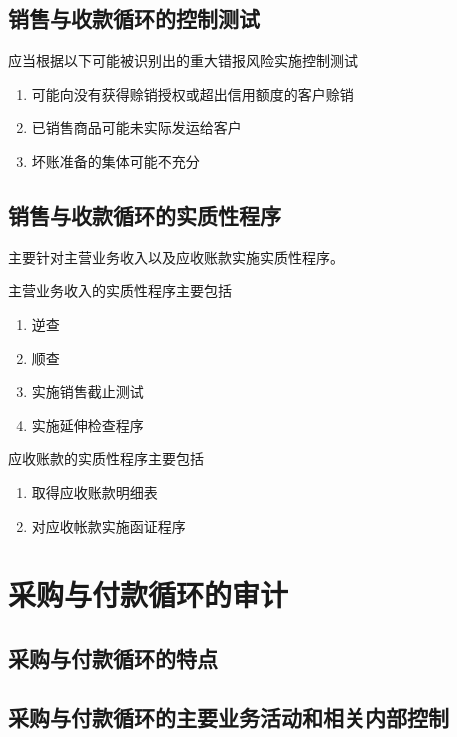 \documentclass[UTF8,12pt]{ctexart}
\numberwithin{equation}{section} %
\numberwithin{figure}{section}
\numberwithin{table}{section}
\begin{document}
	\subsection{销售与收款循环的控制测试}应当根据以下可能被识别出的重大错报风险实施控制测试
	\begin{enumerate}
		\item 可能向没有获得赊销授权或超出信用额度的客户赊销
		
		\item 已销售商品可能未实际发运给客户
		
		\item 坏账准备的集体可能不充分
	\end{enumerate}
	
	\subsection{销售与收款循环的实质性程序}
	主要针对主营业务收入以及应收账款实施实质性程序。
	
	主营业务收入的实质性程序主要包括
	\begin{enumerate}
		\item 逆查
		
		\item 顺查
		
		\item 实施销售截止测试
		
		\item 实施延伸检查程序
	\end{enumerate}
	
	应收账款的实质性程序主要包括
	\begin{enumerate}
		\item 取得应收账款明细表
		
		\item 对应收帐款实施函证程序
	\end{enumerate}
	
	\newpage
	\section{采购与付款循环的审计}
	\subsection{采购与付款循环的特点}
	
	\subsection{采购与付款循环的主要业务活动和相关内部控制}
	
\end{document}
